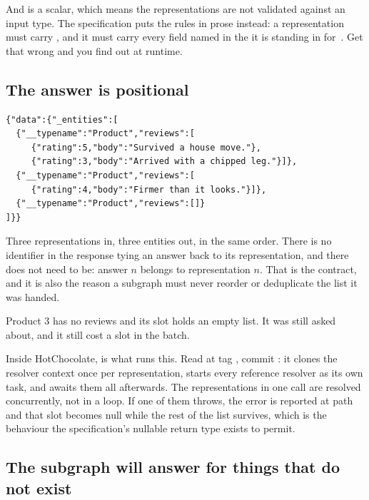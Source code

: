 And  is a scalar, which means the representations are not validated
against an input type. The specification puts the rules in prose instead: a
representation must carry , and it must carry every field named
in the  it is standing in for~\autocite{apollo2026subgraphspec}. Get
that wrong and you find out at runtime.

\subsection*{The answer is positional}

\begin{verbatim}
{"data":{"_entities":[
  {"__typename":"Product","reviews":[
     {"rating":5,"body":"Survived a house move."},
     {"rating":3,"body":"Arrived with a chipped leg."}]},
  {"__typename":"Product","reviews":[
     {"rating":4,"body":"Firmer than it looks."}]},
  {"__typename":"Product","reviews":[]}
]}}
\end{verbatim}

Three representations in, three entities out, in the same order. There is no
identifier in the response tying an answer back to its representation, and there
does not need to be: answer $n$ belongs to representation $n$. That is the
contract, and it is also the reason a subgraph must never reorder or deduplicate
the list it was handed.

Product 3 has no reviews and its slot holds an empty list. It was still asked
about, and it still cost a slot in the batch.

%
Inside HotChocolate,  is what runs this. Read
at tag , commit : it clones the resolver context once
per representation, starts every reference resolver as its own task, and awaits
them all afterwards. The representations in one call are resolved concurrently,
not in a loop. If one of them throws, the error is reported at path
 and that slot becomes null while the rest of the list
survives, which is the behaviour the specification's nullable
\code{[\_Entity]} return type exists to permit.

\subsection*{The subgraph will answer for things that do not exist}

